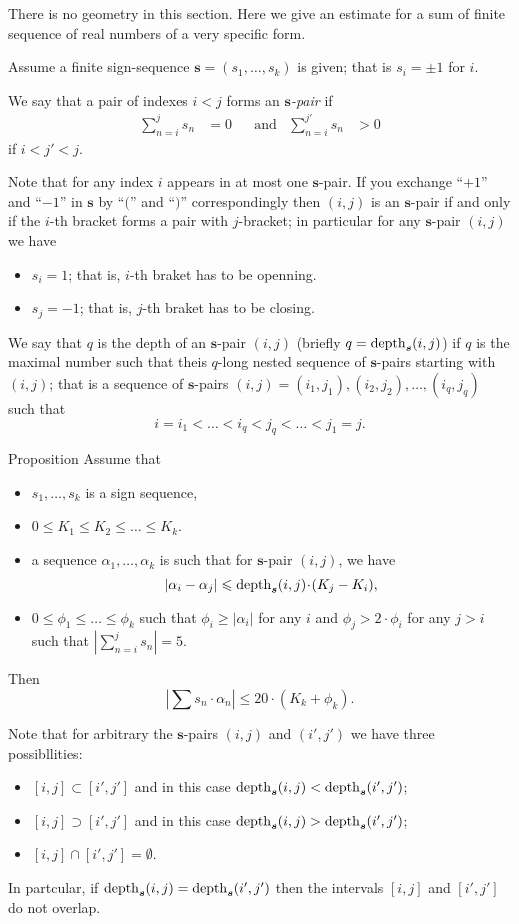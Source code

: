 \documentclass[a4paper,10pt]{amsart}
\begin{document}
There is no geometry in this section.
Here we give an estimate for a sum 
of finite sequence of real numbers 
of a very specific form.


Assume a finite  sign-sequence $\bm{s}=(s_1,\dots, s_k)$
is given;
that is $s_i=\pm1$ for $i$.

We say that a pair of indexes $i< j$
forms an \emph{$\bm{s}$-pair} 
if 
\begin{align*}
\sum_{n=i}^js_n&=0&&
\text{and}&
\sum_{n=i}^{j'}s_n&>0
\end{align*} 
if $i<j'<j$.

Note that for any index $i$ appears in at most one $\bm{s}$-pair.
If you exchange ``$+1$'' and ``$-1$'' in $\bm{s}$ by ``$($'' and ``$)$'' correspondingly then $(i,j)$ is an $\bm{s}$-pair
if and only if the $i$-th bracket forms a pair with $j$-bracket;
in particular for any $\bm{s}$-pair $(i,j)$ we have
\begin{itemize}
\item $s_i=1$; that is, $i$-th braket has to be openning.
 \item $s_j=-1$; that is, $j$-th braket has to be closing.
\end{itemize}

We say that $q$ is the depth of an $\bm{s}$-pair $(i,j)$
(briefly $q=\mathop{\rm depth}\nolimits_{\bm{s}}(i,j)$) 
if $q$ is the maximal number such that theis $q$-long nested sequence of $\bm{s}$-pairs starting with $(i,j)$; 
that is a sequence of $\bm{s}$-pairs
$(i,j)=(i_1,j_1),(i_2,j_2),\dots,(i_q,j_q)$ such that
\[i=i_1<\dots<i_q<j_q<\dots<j_1=j.\]

\begin{thm}{Proposition}
Assume that
\begin{itemize}
\item $s_1,\dots, s_k$ is a sign sequence,
\item $0\le K_1\le K_2\le \dots\le K_k$.
\item a sequence $\alpha_1,\dots,\alpha_k$ is such that for $\bm{s}$-pair $(i,j)$, we have
\[|\alpha_i-\alpha_j|\le \depth_{\bm{s}}(i,j)\cdot(K_j-K_i),\]
\item $0\le \phi_1\le\dots\le\phi_k$ such that $\phi_i\ge |\alpha_i|$ for any $i$ and $\phi_j>2\cdot\phi_i$ for any $j>i$ such that $|\sum_{n=i}^js_n|=5$.
\end{itemize}
Then
\[|\sum s_n\cdot \alpha_n|\le 20\cdot( K_k+ \phi_k).\]

\end{thm}

Note that for arbitrary the $\bm{s}$-pairs $(i,j)$ and $(i',j')$
we have three possibllities:
\begin{itemize}
\item $[i,j]\subset [i',j']$ and in this case $\mathop{\rm depth}\nolimits_{\bm{s}}(i,j)<\mathop{\rm depth}\nolimits_{\bm{s}}(i',j')$;
\item $[i,j]\supset [i',j']$ and in this case $\mathop{\rm depth}\nolimits_{\bm{s}}(i,j)>\mathop{\rm depth}\nolimits_{\bm{s}}(i',j')$;
\item $[i,j]\cap [i',j']=\emptyset$.
\end{itemize}
In partcular, if $\mathop{\rm depth}\nolimits_{\bm{s}}(i,j)=\mathop{\rm depth}\nolimits_{\bm{s}}(i',j')$ then the intervals $[i,j]$ and $[i',j']$ do not overlap.
\end{document}
